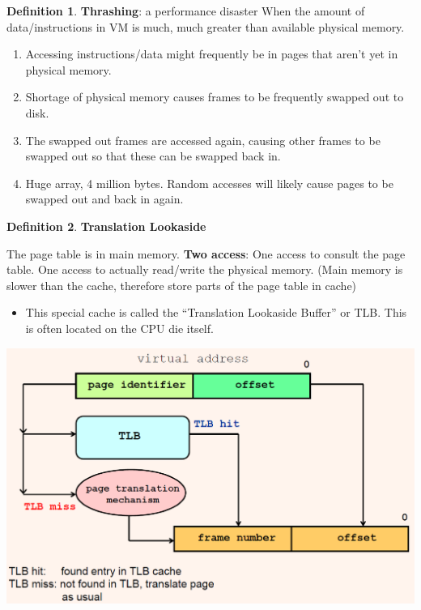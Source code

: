 \documentclass[11pt,a4paper]{article}
\theoremstyle{definition}
\newtheorem{definition}{Definition}[section]
\newenvironment{myitemize}
{ \begin{itemize}
    \setlength{\itemsep}{5pt}
    \setlength{\parskip}{0pt}
    \setlength{\parsep}{0pt}     }
{ \end{itemize}                  }
\newenvironment{myenumerate}
{ \begin{enumerate}
    \setlength{\itemsep}{5pt}
    \setlength{\parskip}{0pt}
    \setlength{\parsep}{0pt}     }
{ \end{enumerate}                }
\begin{document}
\begin{definition}{\textbf{Thrashing}}: a performance disaster
	When the amount of data/instructions in VM is much, much greater than available physical memory.
	\begin{myenumerate}
		\item Accessing instructions/data might frequently be in pages that aren't yet in physical memory.
		\item Shortage of physical memory causes frames to be frequently swapped out to disk.
		\item The swapped out frames are accessed again, causing other frames to be swapped out so that these can be swapped back in.
		\item Huge array, 4 million bytes. Random accesses will likely cause pages to be swapped out and back in again.
	\end{myenumerate}
\end{definition}

\begin{definition}{\textbf{Translation Lookaside}}

\begin{minipage}{0.5\linewidth}
	The page table is in main memory. \textbf{Two access}: One access to consult the page table. One access to actually read/write the physical memory. (Main memory is slower than the cache, therefore store parts of the page table in cache)
	\begin{myitemize}
		\item This special cache is called the ``Translation Lookaside Buffer'' or TLB. This is often located on the CPU die itself.

	\end{myitemize}
\end{minipage}\hspace{5mm}
\begin{minipage}{0.4\linewidth}
	\includegraphics[width=\linewidth]{m5/translationLookasideBuffer}
\end{minipage}
	

\end{definition}









\end{document}
